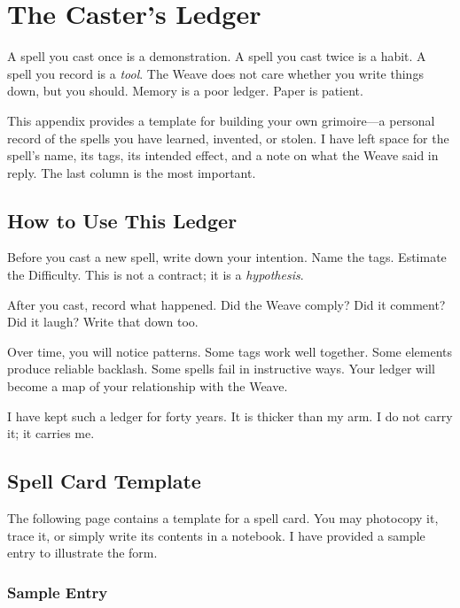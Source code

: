 \chapter{The Caster's Ledger}

A spell you cast once is a demonstration. A spell you cast twice is a habit. A spell you record is a \emph{tool}. The Weave does not care whether you write things down, but you should. Memory is a poor ledger. Paper is patient.

This appendix provides a template for building your own grimoire---a personal record of the spells you have learned, invented, or stolen. I have left space for the spell's name, its tags, its intended effect, and a note on what the Weave said in reply. The last column is the most important.

\section{How to Use This Ledger}

Before you cast a new spell, write down your intention. Name the tags. Estimate the Difficulty. This is not a contract; it is a \emph{hypothesis}.

After you cast, record what happened. Did the Weave comply? Did it comment? Did it laugh? Write that down too.

Over time, you will notice patterns. Some tags work well together. Some elements produce reliable backlash. Some spells fail in instructive ways. Your ledger will become a map of your relationship with the Weave.

I have kept such a ledger for forty years. It is thicker than my arm. I do not carry it; it carries me.

\section{Spell Card Template}

The following page contains a template for a spell card. You may photocopy it, trace it, or simply write its contents in a notebook. I have provided a sample entry to illustrate the form.

\subsection{Sample Entry}

